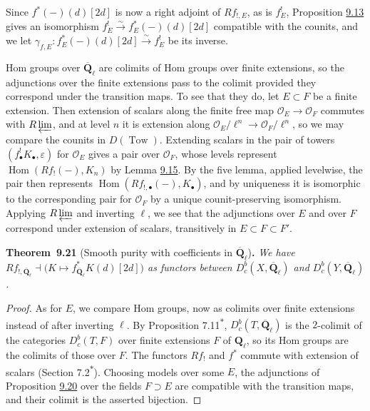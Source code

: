 \documentclass[11pt]{article}
\newenvironment{bpstatement}[2]{\par\addvspace{0.6\baselineskip}\noindent\textbf{#1}#2\textbf{.}\enspace\ignorespaces}
  {\par\addvspace{0.4\baselineskip}}
\newenvironment{bpstatementit}[2]{\begin{bpstatement}{#1}{#2}\itshape\ignorespaces}{\end{bpstatement}}
\newcommand{\bpout}[1]{#1\textsuperscript{\hyperlink{bp-outside}{\ensuremath{\ast}}}}
\providecommand{\Dbc}{}\renewcommand{\Dbc}{D^b_c}
\begin{document}
\label{bp68}%
Since \(f^*(-)(d)[2d]\) is now a right adjoint of \(Rf_{!,E}\), as is \(f^!_E\), Proposition \hyperref[bp41]{9.13} gives an isomorphism \(f^!_E\xrightarrow{\sim}f_E^*(-)(d)[2d]\) compatible with the counits, and we let \(\gamma_{f,E}:f_E^*(-)(d)[2d]\xrightarrow{\sim}f^!_E\) be its inverse.

Hom groups over \(\overline{\mathbf Q}_\ell\) are colimits of Hom groups over finite extensions, so the adjunctions over the finite extensions pass to the colimit provided they correspond under the transition maps. To see that they do, let \(E\subset F\) be a finite extension. Then extension of scalars along the finite free map \(\mathcal O_E\to\mathcal O_F\) commutes with \(R\varprojlim\), and at level \(n\) it is extension along \(\mathcal O_E/\ell^n\to\mathcal O_F/\ell^n\), so we may compare the counits in \(D(\operatorname{Tow})\). Extending scalars in the pair of towers \((f_\bullet^!K_\bullet,\varepsilon)\) for \(\mathcal O_E\) gives a pair over \(\mathcal O_F\), whose levels represent \(\operatorname{Hom}(Rf_!(-),K_n)\) by Lemma \hyperref[bp47]{9.15}. By the five lemma, applied levelwise, the pair then represents \(\operatorname{Hom}(Rf_{!,\bullet}(-),K_\bullet)\), and by uniqueness it is isomorphic to the corresponding pair for \(\mathcal O_F\) by a unique counit-preserving isomorphism. Applying \(R\varprojlim\) and inverting \(\ell\), we see that the adjunctions over \(E\) and over \(F\) correspond under extension of scalars, transitively in \(E\subset F\subset F'\).

\label{bp69}%
\begin{bpstatementit}{Theorem~9.21}{ (Smooth purity with coefficients in $\overline{\mathbf Q}_\ell$)}
We have \(Rf_{!,\overline{\mathbf Q}_\ell}\dashv\bigl(K\mapsto f_{\overline{\mathbf Q}_\ell}^*K(d)[2d]\bigr)\) as functors between \(\Dbc(X,\overline{\mathbf Q}_\ell)\) and \(\Dbc(Y,\overline{\mathbf Q}_\ell)\).
\end{bpstatementit}

\begin{proof}[{Proof}]\label{bp70}%
As for \(E\), we compare Hom groups, now as colimits over finite extensions instead of after inverting \(\ell\). By Proposition \bpout{7.11}, \(\Dbc(T,\overline{\mathbf Q}_\ell)\) is the \(2\)-colimit of the categories \(\Dbc(T,F)\) over finite extensions \(F\) of \(\mathbf Q_\ell\), so its Hom groups are the colimits of those over \(F\). The functors \(Rf_!\) and \(f^*\) commute with extension of scalars (Section \bpout{7.2}). Choosing models over some \(E\), the adjunctions of Proposition \hyperref[bp66]{9.20} over the fields \(F\supset E\) are compatible with the transition maps, and their colimit is the asserted bijection.
\end{proof}
\end{document}
